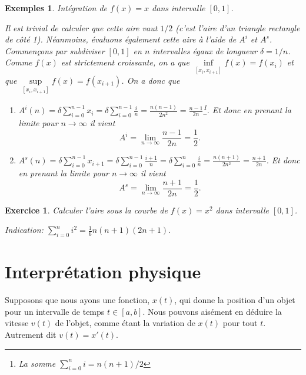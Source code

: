 \documentclass[a4paper,12pt]{book}
\newtheorem*{exemples}{Exemples}
\newtheorem*{exercice}{Exercice}
\begin{document}
\begin{exemples}Intégration de $f(x)=x$ dans intervalle $[0,1]$.

Il est trivial de calculer 
que cette aire vaut $1/2$ (c'est l'aire d'un triangle rectangle de côté 1). Néanmoins, évaluons également cette aire à l'aide de $A^i$ et $A^s$. Commençons par subdiviser $[0,1]$ en $n$ intervalles égaux de longueur 
$\delta=1/n$. Comme $f(x)$ est strictement croissante, on a que 
$\inf\limits_{[x_i,x_{i+1}]}f(x)=f(x_i)$ et que $\sup\limits_{[x_i,x_{i+1}]}f(x)=f(x_{i+1})$. On a donc que
\begin{enumerate}
\item $A^i(n)=\delta\sum_{i=0}^{n-1} x_i=\delta\sum_{i=0}^{n-1}\frac{i}{n}=\frac{n(n-1)}{2n^2}=\frac{n-1}{2n}$\footnote{
La somme $\sum_{i=0}^n i=n(n+1)/2$}. Et donc en prenant la limite pour $n\rightarrow\infty$ il vient
\begin{equation}
A^i=\lim\limits_{n\rightarrow\infty}\frac{n-1}{2n}=\frac{1}{2}.
\end{equation}

\item $A^s(n)=\delta\sum_{i=0}^{n-1} x_{i+1}=\delta\sum_{i=0}^{n-1}\frac{i+1}{n}=\delta\sum_{i=0}^{n}\frac{i}{n}=\frac{n(n+1)}{2n^2}=\frac{n+1}{2n}$. Et donc en prenant la limite pour $n\rightarrow\infty$ il vient
\begin{equation}
A^s=\lim\limits_{n\rightarrow\infty}\frac{n+1}{2n}=\frac{1}{2}.
\end{equation}

\end{enumerate}

\end{exemples}

\begin{exercice}
Calculer l'aire sous la courbe de $f(x)=x^2$ dans intervalle $[0,1]$.

Indication: $\sum_{i=0}^n i^2=\frac{1}{6}n(n+1)(2n+1).$
\end{exercice}

\section{Interprétation physique}

Supposons que nous ayons une fonction, $x(t)$, qui donne la position d'un objet pour un intervalle 
de temps $t\in[a,b]$. Nous pouvons aisément en déduire la vitesse $v(t)$ de l'objet, comme étant la variation
de $x(t)$ pour tout $t$. Autrement dit $v(t)=x'(t)$.
\end{document}
